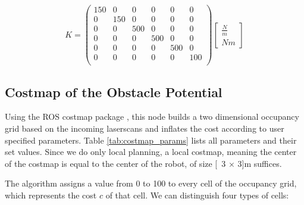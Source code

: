 \begin{equation}
K = \begin{pmatrix}
150 & 0 & 0 & 0 & 0 & 0 \\
0 & 150 & 0 & 0 & 0 & 0 \\
0 & 0 & 500 & 0 & 0 & 0 \\
0 & 0 & 0 & 500 & 0 & 0 \\
0 & 0 & 0 & 0 & 500 & 0 \\
0 & 0 & 0 & 0 & 0 & 100 \\
\end{pmatrix}
\begin{bmatrix}
\frac{N}{m} \\
N m
\end{bmatrix}
\label{eq:K}
\end{equation}

\subsection{Costmap of the Obstacle Potential}
	\label{sec:costmap}
Using the ROS costmap package \citep{rosCostmap}, this node builds a two dimensional occupancy grid based on the incoming laserscans and inflates the cost according to user specified parameters. Table \ref{tab:costmap_params} lists all parameters and their set values. Since we do only local planning, a local costmap, meaning the center of the costmap is equal to the center of the robot, of size \unit[3 $\times$ 3]{m} suffices.

The algorithm assigns a value from 0 to 100 to every cell of the occupancy grid, which represents the cost $c$ of that cell. We can distinguish four types of cells:

